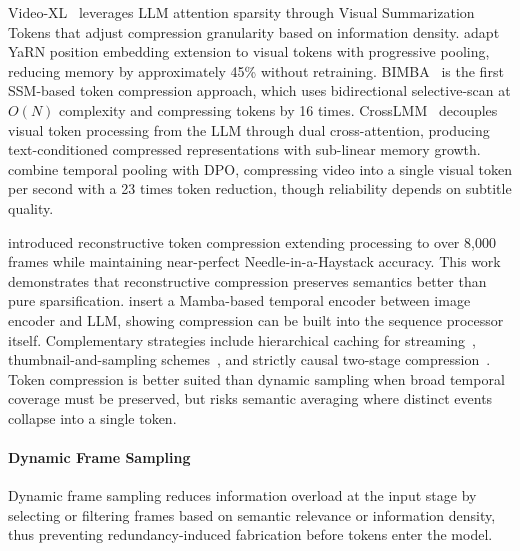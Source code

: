 \documentclass[10pt]{article} %
\begin{document}
Video-XL~\citep{Shu2024VideoXLEV} leverages LLM attention sparsity through Visual Summarization Tokens that adjust compression granularity based on information density. \citet{Wei2024VisualCW} adapt YaRN position embedding extension to visual tokens with progressive pooling, reducing memory by approximately 45\% without retraining. BIMBA~\citep{Islam2025BIMBASC} is the first SSM-based token compression approach, which uses bidirectional selective-scan at $O(N)$ complexity and compressing tokens by 16 times. CrossLMM~\citep{Yan2025CrossLMMDL} decouples visual token processing from the LLM through dual cross-attention, producing text-conditioned compressed representations with sub-linear memory growth. \citet{Dahal2025POVQAPV} combine temporal pooling with DPO, compressing video into a single visual token per second with a 23 times token reduction, though reliability depends on subtitle quality.

\citet{Liu2025VideoXLProRT} introduced reconstructive token compression extending processing to over 8,000 frames while maintaining near-perfect Needle-in-a-Haystack accuracy. This work demonstrates that reconstructive compression preserves semantics better than pure sparsification. \citet{Jiang2025TokenEfficientLV} insert a Mamba-based temporal encoder between image encoder and LLM, showing compression can be built into the sequence processor itself. Complementary strategies include hierarchical caching for streaming~\citep{Wang2025AcceleratingSV}, thumbnail-and-sampling schemes~\citep{Qu2024TSLLaVACV}, and strictly causal two-stage compression~\citep{Chen2025StreamingTOMST}. Token compression is better suited than dynamic sampling when broad temporal coverage must be preserved, but risks semantic averaging where distinct events collapse into a single token.

\paragraph{Dynamic Frame Sampling}

Dynamic frame sampling reduces information overload at the input stage by selecting or filtering frames based on semantic relevance or information density, thus preventing redundancy-induced fabrication before tokens enter the model.
\end{document}
